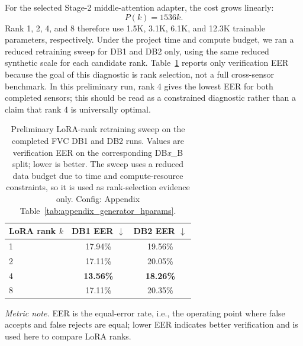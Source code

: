 \documentclass{article}
\begin{document}
For the selected Stage-2 middle-attention adapter, the cost grows linearly:
\begin{equation}
    P(k) = 1536k.
\end{equation}
Rank 1, 2, 4, and 8 therefore use 1.5K, 3.1K, 6.1K, and 12.3K trainable
parameters, respectively.  Under the project time and compute budget, we ran a
reduced retraining sweep for DB1 and DB2 only, using the same reduced synthetic
scale for each candidate rank.  Table~\ref{tab:lora_rank_eer_sweep} reports
only verification EER because the goal of this diagnostic is rank selection, not
a full cross-sensor benchmark.  In this preliminary run, rank 4 gives the lowest
EER for both completed sensors; this should be read as a constrained diagnostic
rather than a claim that rank 4 is universally optimal.

\begin{table}[!htbp]
    \centering
    \footnotesize
    \caption{Preliminary LoRA-rank retraining sweep on the completed FVC DB1 and
    DB2 runs.  Values are verification EER on the corresponding DB\emph{x}\_B
    split; lower is better.  The sweep uses a reduced data budget due to time and
    compute-resource constraints, so it is used as rank-selection evidence only.
    Config: Appendix Table~\ref{tab:appendix_generator_hparams}.}
    \label{tab:lora_rank_eer_sweep}
    \setlength{\tabcolsep}{8pt}
    \renewcommand{\arraystretch}{0.95}
    \begin{tabular}{lcc}
        \toprule
        LoRA rank $k$ & DB1 EER $\downarrow$ & DB2 EER $\downarrow$ \\
        \midrule
        1 & 17.94\% & 19.56\% \\
        2 & 17.11\% & 20.05\% \\
        4 & \textbf{13.56\%} & \textbf{18.26\%} \\
        8 & 17.11\% & 20.35\% \\
        \bottomrule
    \end{tabular}
    \vspace{0.35em}
    \parbox{0.88\linewidth}{\scriptsize\textit{Metric note.}
    EER is the equal-error rate, i.e., the operating point where false accepts
    and false rejects are equal; lower EER indicates better verification and is
    used here to compare LoRA ranks.}
\end{table}
\end{document}
